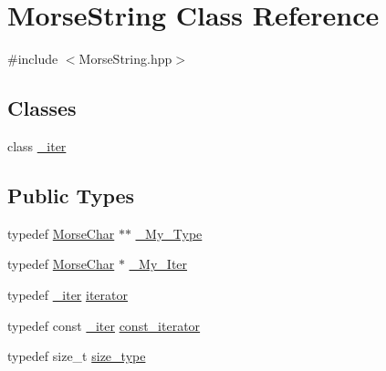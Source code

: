 \hypertarget{class_morse_string}{\section{Morse\-String Class Reference}
\label{class_morse_string}
}


{\ttfamily \#include $<$Morse\-String.\-hpp$>$}

\subsection*{Classes}
\begin{DoxyCompactItemize}
\item 
class \hyperlink{class_morse_string_1_1__iter}{\-\_\-iter}
\end{DoxyCompactItemize}
\subsection*{Public Types}
\begin{DoxyCompactItemize}
\item 
typedef \hyperlink{class_morse_char}{Morse\-Char} $\ast$$\ast$ \hyperlink{class_morse_string_a7f22a5166595e9f06e160159b6b5a878}{\-\_\-\-My\-\_\-\-Type}
\item 
typedef \hyperlink{class_morse_char}{Morse\-Char} $\ast$ \hyperlink{class_morse_string_a9fd4ff95c331104a9e2954921201b8af}{\-\_\-\-My\-\_\-\-Iter}
\item 
typedef \hyperlink{class_morse_string_1_1__iter}{\-\_\-iter} \hyperlink{class_morse_string_aed59863122221676213d8467a2774601}{iterator}
\item 
typedef const \hyperlink{class_morse_string_1_1__iter}{\-\_\-iter} \hyperlink{class_morse_string_a8187161e4517b8721bdb562d90200cfd}{const\-\_\-iterator}
\item 
typedef size\-\_\-t \hyperlink{class_morse_string_a87ad452a5f61d3e7468497bdc03a7e6a}{size\-\_\-type}
\end{DoxyCompactItemize}
